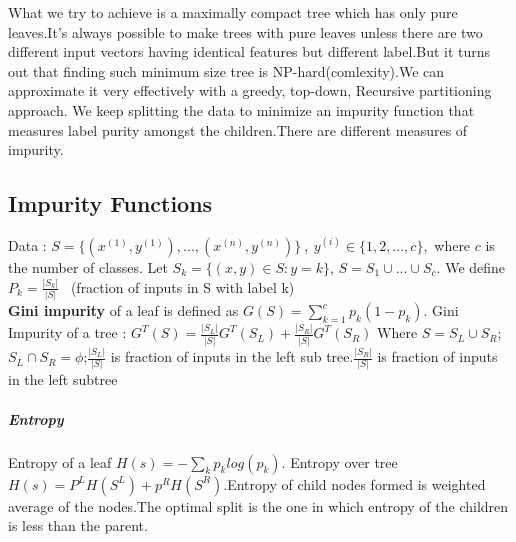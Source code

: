 \documentclass[12pt]{article}
\begin{document}
 
 What we try to achieve is a maximally compact tree which has only pure leaves.It's always possible to make trees with pure leaves unless there are two different input vectors having identical features but different label.But it turns out that finding such minimum size tree is NP-hard(comlexity).We can approximate it very effectively with a greedy, top-down, Recursive partitioning approach.
 We keep splitting the data to minimize an impurity function that measures label purity amongst the children.There are different measures of impurity.
 
 
 
 \subsection{Impurity Functions}
 Data : $S = \{(x^{(1)},y^{(1)}),...,(x^{(n)},y^{(n)})\} \ , \ y^{(i)} \in \{1,2,...,c\},$ where $c$ is the number of classes. Let $S_{k} = \{(x,y) \in S : y  = k\}$, $S = S_{1} \cup ... \cup S_{c}.$ We define $P_{k} = \frac{\vert S_{k} \vert}{\vert S \vert}$ \ (fraction of inputs in S with label k) \\ 
 
\textbf{Gini impurity} of a leaf is defined as $G(S) = \sum_{k = 1}^{c} p_{k}(1 - p_{k})$.
Gini Impurity of a tree  : $G^{T}(S) = \frac{\vert S_{L} \vert}{\vert S \vert} G^{T}(S_{L}) + \frac{\vert S_{R} \vert}{\vert S \vert} G^{T}(S_{R})$
Where $S = S_{L} \cup S_{R}$;
$S_{L} \cap S_{R}  = \phi$;$\frac{\vert S_{L} \vert}{\vert S \vert} $ is fraction of inputs in the left sub tree.$\frac{\vert S_{R} \vert}{\vert S \vert}$ is fraction of inputs in the left subtree 

\subparagraph{Entropy}
 
 Entropy of a leaf $ H(s) = - \sum_{k} p_{k}log(p_k)$. Entropy over tree
 $H(s) = P^{L}H(S^{L}) + p^{R}H(S^R)$.Entropy of child nodes formed is weighted average of the nodes.The optimal split is the one in which entropy of the children is less than the parent.
\end{document}
